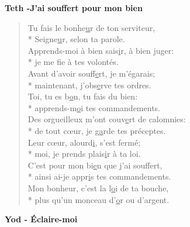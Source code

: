 \textbf{Teth -J’ai souffert pour mon bien}
\begin{verse}
Tu fais le bonhe\underline{u}r de ton serviteur, \\*
Seigne\underline{u}r, selon ta parole. \\
Apprends-moi à bien sais\underline{i}r, à bien juger: \\*
je me f\underline{i}e à tes volontés. \\
Avant d’avoir souff\underline{e}rt, je m’égarais; \\*
maintenant, j’obs\underline{e}rve tes ordres. \\
Toi, tu es b\underline{o}n, tu fais du bien: \\*
apprends-m\underline{o}i tes commandements. \\
Des orgueilleux m’ont couv\underline{e}rt de calomnies: \\*
de tout cœur, je g\underline{a}rde tes préceptes. \\
Leur cœur, alourd\underline{i}, s’est fermé; \\*
moi, je prends plais\underline{i}r à ta loi. \\
C’est pour mon bi\underline{e}n que j’ai souffert, \\*
ainsi ai-je appr\underline{i}s tes commandements. \\
Mon bonheur, c’est la l\underline{o}i de ta bouche, \\*
plus qu’un monceau d’\underline{o}r ou d’argent. \\
\end{verse}
\textbf{Yod - Éclaire-moi}
